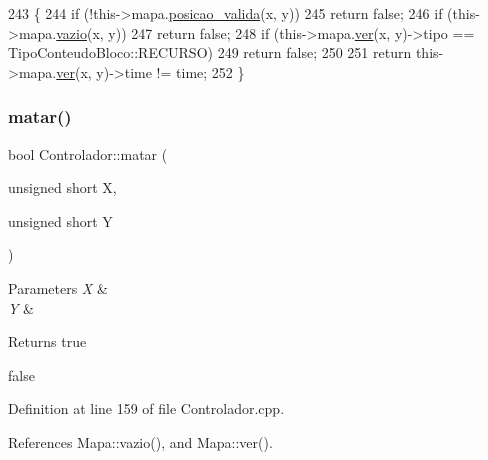 \begin{DoxyCode}
243                                                                                        \{
244     \textcolor{keywordflow}{if} (!this->mapa.\mbox{\hyperlink{class_mapa_aa07c1444720958b3efbc734d2691361d}{posicao\_valida}}(x, y))
245         \textcolor{keywordflow}{return} \textcolor{keyword}{false};
246     \textcolor{keywordflow}{if} (this->mapa.\mbox{\hyperlink{class_mapa_a5bdde997d3c97c5b6fb7d37c124cdf93}{vazio}}(x, y))
247         \textcolor{keywordflow}{return} \textcolor{keyword}{false};
248     \textcolor{keywordflow}{if} (this->mapa.\mbox{\hyperlink{class_mapa_a52dbdf40a47afb56b1cb35dd1cb552f5}{ver}}(x, y)->tipo == TipoConteudoBloco::RECURSO)
249         \textcolor{keywordflow}{return} \textcolor{keyword}{false};
250 
251     \textcolor{keywordflow}{return} this->mapa.\mbox{\hyperlink{class_mapa_a52dbdf40a47afb56b1cb35dd1cb552f5}{ver}}(x, y)->time != time;
252 \}
\end{DoxyCode}
\mbox{\label{class_controlador_a2455948558b79285060dbd2dd8d15bf1}} 
\subsubsection{\texorpdfstring{matar()}{matar()}}
{\footnotesize\ttfamily bool Controlador\+::matar (\begin{DoxyParamCaption}\item[{unsigned short}]{X,  }\item[{unsigned short}]{Y }\end{DoxyParamCaption})}


\begin{DoxyParams}{Parameters}
{\em X} & \\
\hline
{\em Y} & \\
\hline
\end{DoxyParams}
\begin{DoxyReturn}{Returns}
true 

false 
\end{DoxyReturn}


Definition at line 159 of file Controlador.\+cpp.



References Mapa\+::vazio(), and Mapa\+::ver().


